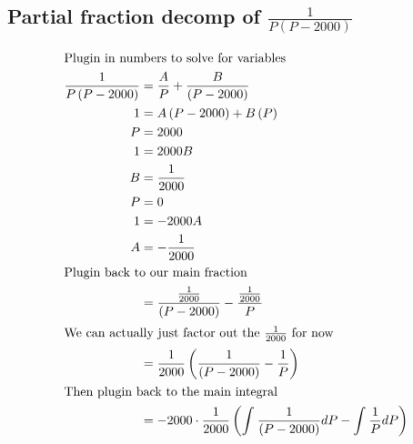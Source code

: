 \documentclass[12pt]{article}
\begin{document}
\subsection{\textbf{Partial fraction decomp of \texorpdfstring{$\frac{1}{P\left(P-2000\right)}$}{Lg}}}
\begin{align}
  \intertext{Plugin in numbers to solve for variables}
  \frac{1}{P\left(P-2000\right)}   & =\frac{A}{P}+\frac{B}{\left(P-2000\right)}                                                                  \\
  1                                & =A\left(P-2000\right)+B\left(P\right)                                                                       \\
  P                                & =2000                                                                                                       \\
  1                                & =2000B                                                                                                      \\
  B                                & =\frac{1}{2000}                                                                                             \\
  P                                & =0                                                                                                          \\
  1                                & =-2000A                                                                                                     \\
  A                                & =-\frac{1}{2000}                                                                                            \\
  \intertext{Plugin back to our main fraction}
                                   & =\frac{\frac{1}{2000}}{\left(P-2000\right)}-\frac{\frac{1}{2000}}{P}                                        \\
  \intertext{We can actually just factor out the $\frac{1}{2000}$ for now}
                                   & =\frac{1}{2000}\left(\frac{1}{\left(P-2000\right)}-\frac{1}{P}\right)                                       \\
  \intertext{Then plugin back to the main integral}
                                   & =-2000\cdot\frac{1}{2000}\left(\int_{ }^{ }\frac{1}{\left(P-2000\right)}dP-\int_{ }^{ }\frac{1}{P}dP\right) \\

\end{align}
\end{document}
